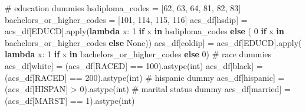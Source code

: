 \documentclass[
  letterpaper,
  DIV=11,
  numbers=noendperiod]{scrartcl}
\newenvironment{Shaded}{\begin{snugshade}}{\end{snugshade}}
\newcommand{\BuiltInTok}[1]{\textcolor[rgb]{0.00,0.23,0.31}{#1}}
\newcommand{\CommentTok}[1]{\textcolor[rgb]{0.37,0.37,0.37}{#1}}
\newcommand{\ControlFlowTok}[1]{\textcolor[rgb]{0.00,0.23,0.31}{\textbf{#1}}}
\newcommand{\DecValTok}[1]{\textcolor[rgb]{0.68,0.00,0.00}{#1}}
\newcommand{\KeywordTok}[1]{\textcolor[rgb]{0.00,0.23,0.31}{\textbf{#1}}}
\newcommand{\NormalTok}[1]{\textcolor[rgb]{0.00,0.23,0.31}{#1}}
\newcommand{\OperatorTok}[1]{\textcolor[rgb]{0.37,0.37,0.37}{#1}}
\newcommand{\StringTok}[1]{\textcolor[rgb]{0.13,0.47,0.30}{#1}}
\newcommand{\VariableTok}[1]{\textcolor[rgb]{0.07,0.07,0.07}{#1}}
\begin{document}
\begin{Shaded}
\begin{Highlighting}[]
\CommentTok{\# education dummies}
\NormalTok{hsdiploma\_codes }\OperatorTok{=}\NormalTok{ [}\DecValTok{62}\NormalTok{, }\DecValTok{63}\NormalTok{, }\DecValTok{64}\NormalTok{, }\DecValTok{81}\NormalTok{, }\DecValTok{82}\NormalTok{, }\DecValTok{83}\NormalTok{]}
\NormalTok{bachelors\_or\_higher\_codes }\OperatorTok{=}\NormalTok{ [}\DecValTok{101}\NormalTok{, }\DecValTok{114}\NormalTok{, }\DecValTok{115}\NormalTok{, }\DecValTok{116}\NormalTok{]}
\NormalTok{acs\_df[}\StringTok{\textquotesingle{}hsdip\textquotesingle{}}\NormalTok{] }\OperatorTok{=}\NormalTok{ acs\_df[}\StringTok{\textquotesingle{}EDUCD\textquotesingle{}}\NormalTok{].}\BuiltInTok{apply}\NormalTok{(}\KeywordTok{lambda}\NormalTok{ x: }\DecValTok{1} \ControlFlowTok{if}\NormalTok{ x }\KeywordTok{in}\NormalTok{ hsdiploma\_codes }\ControlFlowTok{else}\NormalTok{ (}
    \DecValTok{0} \ControlFlowTok{if}\NormalTok{ x }\KeywordTok{in}\NormalTok{ bachelors\_or\_higher\_codes }\ControlFlowTok{else} \VariableTok{None}\NormalTok{))}
\NormalTok{acs\_df[}\StringTok{\textquotesingle{}coldip\textquotesingle{}}\NormalTok{] }\OperatorTok{=}\NormalTok{ acs\_df[}\StringTok{\textquotesingle{}EDUCD\textquotesingle{}}\NormalTok{].}\BuiltInTok{apply}\NormalTok{(}
    \KeywordTok{lambda}\NormalTok{ x: }\DecValTok{1} \ControlFlowTok{if}\NormalTok{ x }\KeywordTok{in}\NormalTok{ bachelors\_or\_higher\_codes }\ControlFlowTok{else} \DecValTok{0}\NormalTok{)}
\CommentTok{\# race dummies}
\NormalTok{acs\_df[}\StringTok{\textquotesingle{}white\textquotesingle{}}\NormalTok{] }\OperatorTok{=}\NormalTok{ (acs\_df[}\StringTok{\textquotesingle{}RACED\textquotesingle{}}\NormalTok{] }\OperatorTok{==} \DecValTok{100}\NormalTok{).astype(}\BuiltInTok{int}\NormalTok{)}
\NormalTok{acs\_df[}\StringTok{\textquotesingle{}black\textquotesingle{}}\NormalTok{] }\OperatorTok{=}\NormalTok{ (acs\_df[}\StringTok{\textquotesingle{}RACED\textquotesingle{}}\NormalTok{] }\OperatorTok{==} \DecValTok{200}\NormalTok{).astype(}\BuiltInTok{int}\NormalTok{)}
\CommentTok{\# hispanic dummy}
\NormalTok{acs\_df[}\StringTok{\textquotesingle{}hispanic\textquotesingle{}}\NormalTok{] }\OperatorTok{=}\NormalTok{ (acs\_df[}\StringTok{\textquotesingle{}HISPAN\textquotesingle{}}\NormalTok{] }\OperatorTok{\textgreater{}} \DecValTok{0}\NormalTok{).astype(}\BuiltInTok{int}\NormalTok{)}
\CommentTok{\# marital status dummy}
\NormalTok{acs\_df[}\StringTok{\textquotesingle{}married\textquotesingle{}}\NormalTok{] }\OperatorTok{=}\NormalTok{ (acs\_df[}\StringTok{\textquotesingle{}MARST\textquotesingle{}}\NormalTok{] }\OperatorTok{==} \DecValTok{1}\NormalTok{).astype(}\BuiltInTok{int}\NormalTok{)}

\end{Highlighting}
\end{Shaded}
\end{document}
